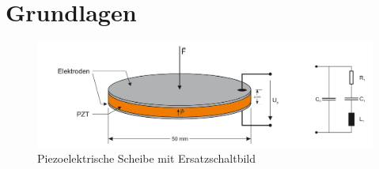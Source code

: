 \chapter{Grundlagen} \label{Grundlagen}



\begin{figure}[h]
    \centering
    \includegraphics[width=1 \textwidth]{image/Piezo_Skizze.png}
    \caption{Piezoelektrische Scheibe mit Ersatzschaltbild  \cite{laborpraktikum2022} }
    \label{img:Ersartzschaltbild}
\end{figure}




